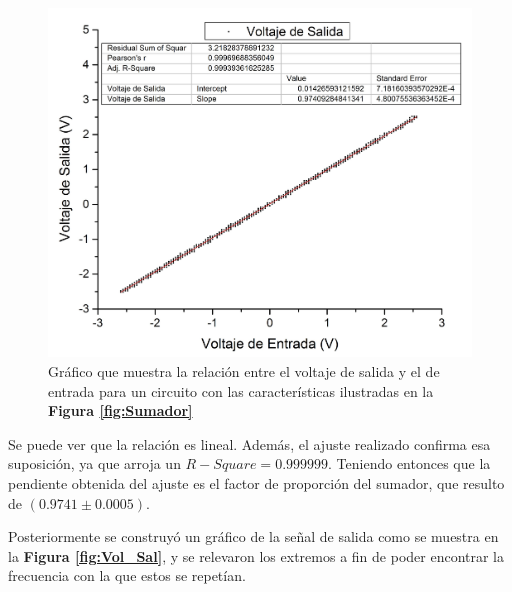 \documentclass[11pt,a4paper]{article}
\begin{document}
\begin{figure}[h]
\centering
\includegraphics[scale=0.35]{Salida_vs_Entrada}
\caption{Gráfico que muestra la relación entre el voltaje de salida y el de entrada para un circuito con las características ilustradas en la \textbf{Figura \ref{fig:Sumador}}}
\label{fig:S_vs_E}
\end{figure}

Se puede ver que la relación es lineal. Además, el ajuste realizado confirma esa suposición, ya que arroja un $R-Square=0.999999$. Teniendo entonces que la pendiente obtenida del ajuste es el factor de proporción del sumador, que resulto de $(0.9741 \pm 0.0005)$. 

Posteriormente se construyó un gráfico de la señal de salida como se muestra en la \textbf{Figura \ref{fig:Vol_Sal}}, y se relevaron los extremos a fin de poder encontrar la frecuencia con la que estos se repetían.
\end{document}
